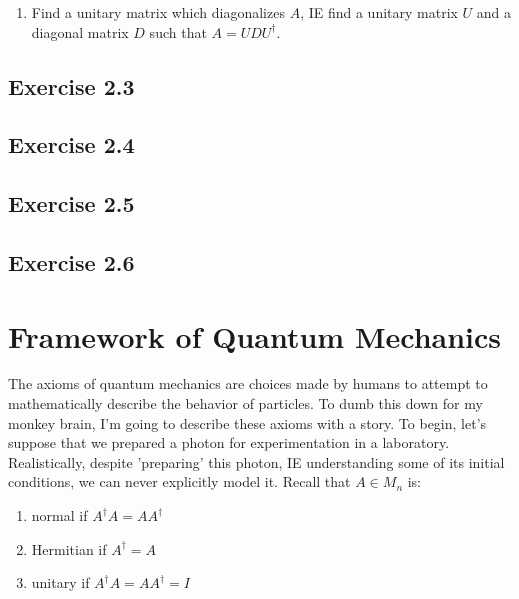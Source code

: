 \documentclass[12pt]{article}
\theoremstyle{plain}
\theoremstyle{nonumberplain}
\theoremstyle{plain}
\theoremstyle{nonumberplain}
\newcommand\1{{\bf 1}}
\newcommand{\<}{\left\langle}
\renewcommand{\>}{\right\rangle}
\begin{document}
\begin{enumerate}[label=(\alph*)]
\item Find a unitary matrix which diagonalizes $A$, IE find a unitary matrix $U$ and a diagonal matrix $D$ such that $A=UDU^\dagger$.
\end{enumerate}


\subsection{Exercise 2.3}


\subsection{Exercise 2.4}


\subsection{Exercise 2.5}



\subsection{Exercise 2.6}



\section{Framework of Quantum Mechanics}

The axioms of quantum mechanics are choices made by humans to attempt to mathematically describe the behavior of particles. To dumb this down for my monkey brain, I'm going to describe these axioms with a story. To begin, let's suppose that we prepared a photon for experimentation in a laboratory. Realistically, despite 'preparing' this photon, IE understanding some of its initial conditions, we can never explicitly model it. Recall that $A\in M_n$ is:
\begin{enumerate}
\item normal if $A^\dagger A=AA^\dagger$
\item Hermitian if $A^\dagger=A$
\item unitary if $A^\dagger A=AA^\dagger=I$
\end{enumerate}
\end{document}
